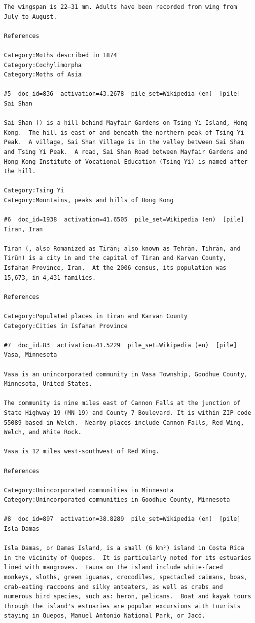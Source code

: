\begin{verbatim}
The wingspan is 22–31 mm. Adults have been recorded from wing from July to August.

References

Category:Moths described in 1874
Category:Cochylimorpha
Category:Moths of Asia

#5  doc_id=836  activation=43.2678  pile_set=Wikipedia (en)  [pile]
Sai Shan

Sai Shan () is a hill behind Mayfair Gardens on Tsing Yi Island, Hong Kong.  The hill is east of and beneath the northern peak of Tsing Yi Peak.  A village, Sai Shan Village is in the valley between Sai Shan and Tsing Yi Peak.  A road, Sai Shan Road between Mayfair Gardens and Hong Kong Institute of Vocational Education (Tsing Yi) is named after the hill.

Category:Tsing Yi
Category:Mountains, peaks and hills of Hong Kong

#6  doc_id=1938  activation=41.6505  pile_set=Wikipedia (en)  [pile]
Tiran, Iran

Tiran (, also Romanized as Tīrān; also known as Tehrān, Tihrān, and Tirūn) is a city in and the capital of Tiran and Karvan County, Isfahan Province, Iran.  At the 2006 census, its population was 15,673, in 4,431 families.

References

Category:Populated places in Tiran and Karvan County
Category:Cities in Isfahan Province

#7  doc_id=83  activation=41.5229  pile_set=Wikipedia (en)  [pile]
Vasa, Minnesota

Vasa is an unincorporated community in Vasa Township, Goodhue County, Minnesota, United States.

The community is nine miles east of Cannon Falls at the junction of State Highway 19 (MN 19) and County 7 Boulevard. It is within ZIP code 55089 based in Welch.  Nearby places include Cannon Falls, Red Wing, Welch, and White Rock.

Vasa is 12 miles west-southwest of Red Wing.

References

Category:Unincorporated communities in Minnesota
Category:Unincorporated communities in Goodhue County, Minnesota

#8  doc_id=897  activation=38.8289  pile_set=Wikipedia (en)  [pile]
Isla Damas

Isla Damas, or Damas Island, is a small (6 km²) island in Costa Rica in the vicinity of Quepos.  It is particularly noted for its estuaries lined with mangroves.  Fauna on the island include white-faced monkeys, sloths, green iguanas, crocodiles, spectacled caimans, boas, crab-eating raccoons and silky anteaters, as well as crabs and numerous bird species, such as: heron, pelicans.  Boat and kayak tours through the island's estuaries are popular excursions with tourists staying in Quepos, Manuel Antonio National Park, or Jacó.


\end{verbatim}
